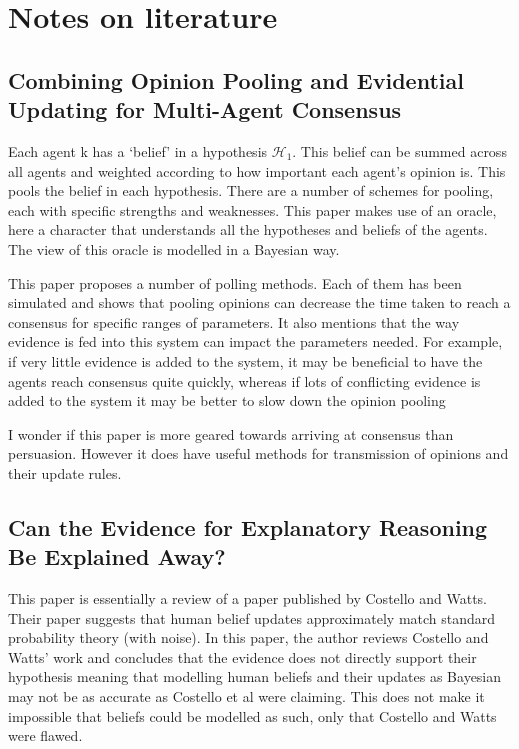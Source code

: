 \section{Notes on literature}
\subsection{Combining Opinion Pooling and Evidential Updating for Multi-Agent Consensus\cite{Lee2017CombiningConsensus}}

Each agent k has a `belief' in a hypothesis $\mathcal{H_1}$. This belief can be summed across all agents and weighted according to how important each agent's opinion is. This pools the belief in each hypothesis. There are a number of schemes for pooling, each with specific strengths and weaknesses. This paper makes use of an oracle, here a character that understands all the hypotheses and beliefs of the agents. The view of this oracle is modelled in a Bayesian way. 

This paper proposes a number of polling methods. Each of them has been simulated and shows that pooling opinions can decrease the time taken to reach a consensus for specific ranges of parameters. It also mentions that the way evidence is fed into this system can impact the parameters needed. For example, if very little evidence is added to the system, it may be beneficial to have the agents reach consensus quite quickly, whereas if lots of conflicting evidence is added to the system it may be better to slow down the opinion pooling

I wonder if this paper is more geared towards arriving at consensus than persuasion. However it does have useful methods for transmission of opinions and their update rules. 

\subsection{Can the Evidence for Explanatory Reasoning
Be Explained Away?\cite{Zadeh1986ACombination}}

This paper is essentially a review of a paper published by Costello and Watts. Their paper suggests that human belief updates approximately match standard probability theory (with noise). In this paper, the author reviews Costello and Watts' work and concludes that the evidence does not directly support their hypothesis meaning that modelling human beliefs and their updates as Bayesian may not be as accurate as Costello et al were claiming. This does not make it impossible that beliefs could be modelled as such, only that Costello and Watts were flawed.

